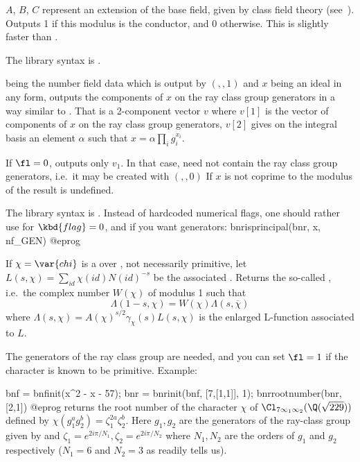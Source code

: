\label{se:bnrisconductor}
$A$, $B$, $C$ represent
an extension of the base field, given by class field theory
(see~). Outputs 1 if this modulus is the conductor, and 0
otherwise. This is slightly faster than .

The library syntax is .

\label{se:bnrisprincipal}
 being the
number field data which is output by $(,,1)$ and $x$ being an
ideal in any form, outputs the components of $x$ on the ray class group
generators in a way similar to . That is a 2-component
vector $v$ where $v[1]$ is the vector of components of $x$ on the ray class
group generators, $v[2]$ gives on the integral basis an element $\alpha$ such
that $x=\alpha\prod_ig_i^{x_i}$.

If $\fl=0$, outputs only $v_1$. In that case,  need not contain the
ray class group generators, i.e.~it may be created with $(,,0)$
If $x$ is not coprime to the modulus of  the result is undefined.

The library syntax is .
Instead of hardcoded  numerical flags,  one should rather
use
 for $\kbd{flag} = 0$, and if you
want generators:
\bprog
  bnrisprincipal(bnr, x, nf_GEN)
@eprog

\label{se:bnrrootnumber}
If $\chi=\var{chi}$ is a
 over , not necessarily primitive, let
$L(s,\chi) = \sum_{id} \chi(id) N(id)^{-s}$ be the associated
. Returns the so-called , i.e.~the
complex number $W(\chi)$ of modulus 1 such that
%
$$\Lambda(1-s,\chi) = W(\chi) \Lambda(s,\overline{\chi})$$
%
\noindent where $\Lambda(s,\chi) = A(\chi)^{s/2}\gamma_\chi(s) L(s,\chi)$ is
the enlarged L-function associated to $L$.

The generators of the ray class group are needed, and you can set $\fl=1$ if
the character is known to be primitive. Example:

\bprog
bnf = bnfinit(x^2 - x - 57);
bnr = bnrinit(bnf, [7,[1,1]], 1);
bnrrootnumber(bnr, [2,1])
@eprog\noindent
returns the root number of the character $\chi$ of
$\Cl_{7\infty_1\infty_2}(\Q(\sqrt{229}))$ defined by $\chi(g_1^ag_2^b)
= \zeta_1^{2a}\zeta_2^b$. Here $g_1, g_2$ are the generators of the
ray-class group given by  and $\zeta_1 = e^{2i\pi/N_1},
\zeta_2 = e^{2i\pi/N_2}$ where $N_1, N_2$ are the orders of $g_1$ and
$g_2$ respectively ($N_1=6$ and $N_2=3$ as  readily tells us).

